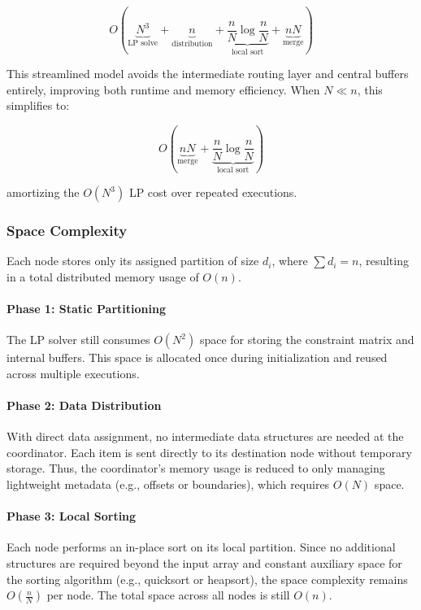 \documentclass[]{interact}
\theoremstyle{plain}
\theoremstyle{definition}
\theoremstyle{remark}
\begin{document}
\begin{equation}
    O\left( 
        \underbrace{N^3}_{\text{LP solve}} 
        + \underbrace{n}_{\text{distribution}} 
        + \underbrace{\frac{n}{N} \log \frac{n}{N}}_{\text{local sort}} 
        + \underbrace{nN}_{\text{merge}}
    \right)
\end{equation}

This streamlined model avoids the intermediate routing layer and central buffers entirely, improving both runtime and memory efficiency. When $N \ll n$, this simplifies to:

\begin{equation}
    O\left( 
        \underbrace{nN}_{\text{merge}} 
        + \underbrace{\frac{n}{N} \log \frac{n}{N}}_{\text{local sort}} 
    \right)
\end{equation}

amortizing the $O(N^3)$ LP cost over repeated executions.

\subsubsection{Space Complexity}
Each node stores only its assigned partition of size $d_i$, where $\sum d_i = n$, resulting in a total distributed memory usage of $O(n)$.

\paragraph{Phase 1: Static Partitioning}
The LP solver still consumes $O(N^2)$ space for storing the constraint matrix and internal buffers. This space is allocated once during initialization and reused across multiple executions.

\paragraph{Phase 2: Data Distribution}
With direct data assignment, no intermediate data structures are needed at the coordinator. Each item is sent directly to its destination node without temporary storage. Thus, the coordinator’s memory usage is reduced to only managing lightweight metadata (e.g., offsets or boundaries), which requires $O(N)$ space.

\paragraph{Phase 3: Local Sorting}
Each node performs an in-place sort on its local partition. Since no additional structures are required beyond the input array and constant auxiliary space for the sorting algorithm (e.g., quicksort or heapsort), the space complexity remains $O\left(\frac{n}{N}\right)$ per node. The total space across all nodes is still $O(n)$.
\end{document}
